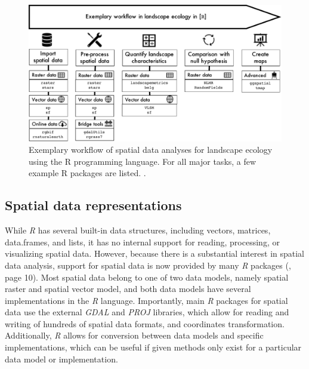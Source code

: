 \documentclass[smallextended]{svjour3}       %
\begin{document}
\begin{figure}
\includegraphics[width=1\linewidth,height=0.3\textheight]{data/Workflow} \caption{Exemplary workflow of spatial data analyses for landscape ecology using the R programming language. For all major tasks, a few example R packages are listed. .}\label{fig:fig-workflow}
\end{figure}

\hypertarget{sec:spatrep}{%
\subsection{Spatial data representations}\label{sec:spatrep}}

While \emph{R} has several built-in data structures, including vectors, matrices, data.frames, and lists, it has no internal support for reading, processing, or visualizing spatial data.
However, because there is a substantial interest in spatial data analysis, support for spatial data is now provided by many \emph{R} packages (\cite{Lovelace2019}, page 10).
Most spatial data belong to one of two data models, namely spatial raster and spatial vector model, and both data models have several implementations in the \emph{R} language.
Importantly, main \emph{R} packages for spatial data use the external \emph{GDAL} and \emph{PROJ} libraries, which allow for reading and writing of hundreds of spatial data formats, and coordinates transformation.
Additionally, \emph{R} allows for conversion between data models and specific implementations, which can be useful if given methods only exist for a particular data model or implementation.
\end{document}
